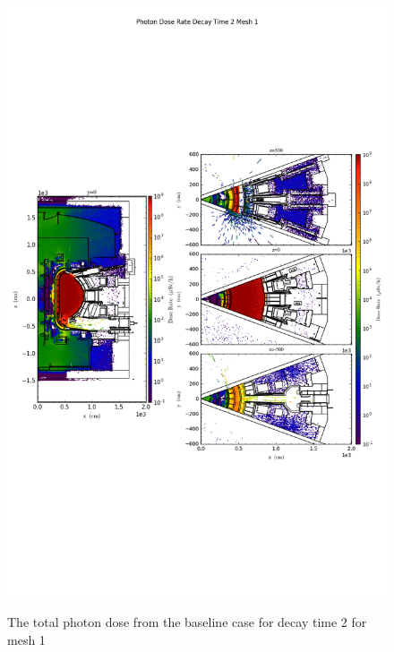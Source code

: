 \begin{figure}[ht!]
\centering
\includegraphics[trim={0cm 9cm 0cm 10cm},clip,scale=0.75]{../plots/final_model_nob4c/Photon_Dose_Rate_Decay_Time_2_Mesh_1.png}
\label{fig:photons_dc2_no4bc_m1_flux}
\caption{The total photon dose from the baseline case for decay time 2 for mesh 1}
\end{figure}
